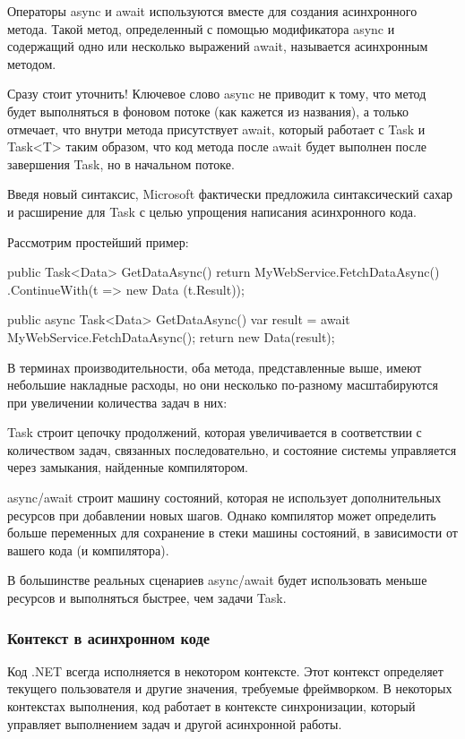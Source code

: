 Операторы async и await используются вместе для создания асинхронного метода. Такой метод, определенный с помощью модификатора async и содержащий одно или несколько выражений await, называется асинхронным методом.

Сразу стоит уточнить! Ключевое слово async не приводит к тому, что метод будет выполняться в фоновом потоке (как кажется из названия), а только отмечает, что внутри метода присутствует await, который работает с Task и Task<T> таким образом, что код метода после await будет выполнен после завершения Task, но в начальном потоке.

Введя новый синтаксис, Microsoft фактически предложила синтаксический сахар и расширение для Task с целью упрощения написания асинхронного кода.

Рассмотрим простейший пример:

public Task<Data> GetDataAsync()
{
    return MyWebService.FetchDataAsync()
        .ContinueWith(t => new Data (t.Result));
}

public async Task<Data> GetDataAsync()
{
    var result = await MyWebService.FetchDataAsync();
    return new Data(result);
}

В терминах производительности, оба метода, представленные выше, имеют небольшие накладные расходы, но они несколько по-разному масштабируются при увеличении количества задач в них:

Task строит цепочку продолжений, которая увеличивается в соответствии с количеством задач, связанных последовательно, и состояние системы управляется через замыкания, найденные компилятором.

async/await строит машину состояний, которая не использует дополнительных ресурсов при добавлении новых шагов. Однако компилятор может определить больше переменных для сохранение в стеки машины состояний, в зависимости от вашего кода (и компилятора).

В большинстве реальных сценариев async/await будет использовать меньше ресурсов и выполняться быстрее, чем задачи Task.


\subsubsection{Контекст в асинхронном коде}

Код .NET всегда исполняется в некотором контексте. Этот контекст определяет текущего пользователя и другие значения, требуемые фреймворком. В некоторых контекстах выполнения, код работает в контексте синхронизации, который управляет выполнением задач и другой асинхронной работы.

